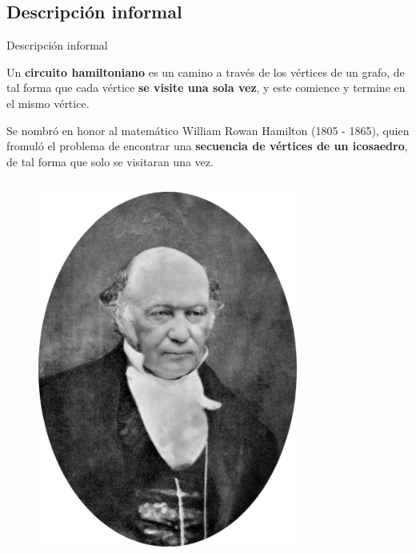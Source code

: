 \documentclass{beamer}
\begin{document}
\subsection{Descripción informal}
\begin{frame}{Descripción informal}
    \begin{definition}
        Un \textbf{circuito hamiltoniano} es un camino a través de los vértices de un grafo, de tal forma que cada vértice \textbf{se visite una sola vez}, y este comience y termine en el mismo vértice.
    \end{definition}
    Se nombró en honor al matemático William Rowan Hamilton (1805 - 1865), quien fromuló el problema de encontrar una \textbf{secuencia de vértices de un icosaedro}, de tal forma que solo se visitaran una vez.
    \begin{columns}
        \begin{figure}
            \centering
            \includegraphics[scale=0.18]{images/william-rowan-hamilton.png}
        \end{figure}
        \begin{figure}
            \centering

\end{figure}
\end{columns}
\end{frame}
\end{document}
